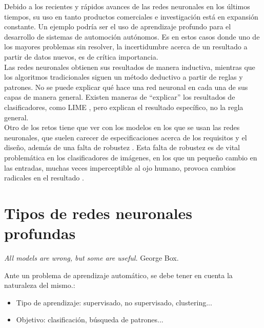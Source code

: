 \documentclass[11pt,twoside,titlepage,a4paper]{article}
\newcommand{\margenimagen}{
\newgeometry{
    left=2.5cm, %
	right=5cm, %
	bottom=2.5cm %
}
}
\numberwithin{equation}{section} %
\theoremstyle{usual}
\begin{document}
Debido a los recientes y rápidos avances de las redes neuronales
en los últimos tiempos, su uso en tanto productos comerciales e
investigación está en expansión constante. Un ejemplo podría ser
el uso de aprendizaje profundo para el desarrollo de sistemas de 
automoción autónomos. Es en estos casos donde uno de los mayores
problemas sin resolver, la incertidumbre acerca de un resultado
a partir de datos nuevos, es de crítica importancia. \\

Las redes neuronales obtienen sus resultados de manera inductiva,
mientras que los algoritmos tradicionales siguen un método deductivo
a partir de reglas y patrones. No se puede explicar qué hace una red
neuronal en cada una de sus capas de manera general. Existen maneras
de ``explicar'' los resultados de clasificadores, como LIME \cite{lime}, pero explican el resultado específico, no la regla
general.\\

Otro de los retos tiene que ver con los modelos en los que se usan
las redes neuronales, que suelen carecer de especificaciones acerca
de los requisitos y el diseño, además de una falta de robustez
\cite{security-neuralnets}.
Esta falta de robustez es de vital problemática en los 
clasificadores de imágenes, en los que un pequeño cambio en las
entradas, muchas veces imperceptible al ojo humano, provoca cambios
radicales en el resultado \cite{image-class}.

\newpage
\margenimagen
\section {Tipos de redes neuronales profundas}
    \begin{minipage}{0.9\linewidth}
        \vspace{5pt}%
             \begin{flushright}
            
        {\small
            \textit{All models are wrong, but some are useful.}
        }
        \vspace{5pt}%
         George Box.
        \end{flushright}
    \end{minipage}

Ante un problema de aprendizaje automático, se debe tener en cuenta la naturaleza del mismo.:
\begin{itemize}
    \item Tipo de aprendizaje: supervisado, no supervisado, clustering...
    \item Objetivo: clasificación, búsqueda de patrones...
\end{itemize} 
\end{document}
